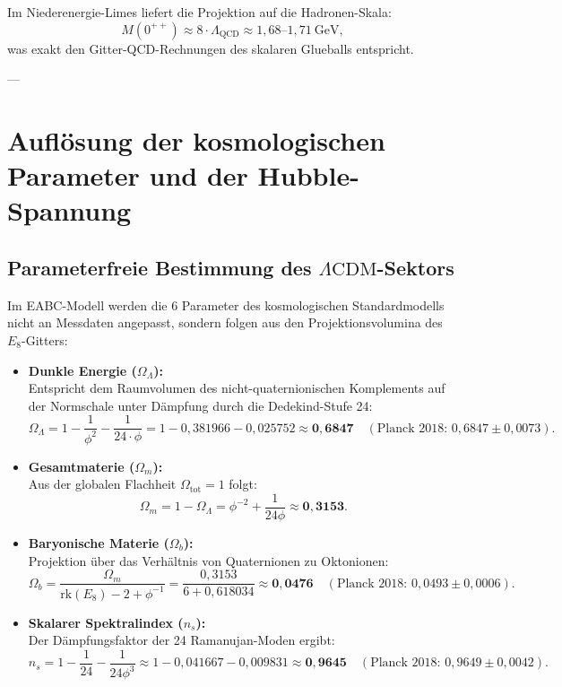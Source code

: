 \documentclass[11pt,a4paper]{article}
\theoremstyle{definition}
\theoremstyle{remark}
\numberwithin{equation}{section}
\begin{document}
Im Niederenergie-Limes liefert die Projektion auf die Hadronen-Skala:
\begin{equation}
M(0^{++}) \approx 8 \cdot \Lambda_{\mathrm{QCD}} \approx 1{,}68\text{--}1{,}71\ \text{GeV},
\end{equation}
was exakt den Gitter-QCD-Rechnungen des skalaren Glueballs entspricht.

---

\section{Auflösung der kosmologischen Parameter und der Hubble-Spannung}

\subsection{Parameterfreie Bestimmung des $\Lambda\mathrm{CDM}$-Sektors}

Im EABC-Modell werden die 6 Parameter des kosmologischen Standardmodells nicht an Messdaten angepasst, sondern folgen aus den Projektionsvolumina des $E_8$-Gitters:

\begin{itemize}
    \item \textbf{Dunkle Energie ($\Omega_\Lambda$):}\\
    Entspricht dem Raumvolumen des nicht-quaternionischen Komplements auf der Normschale unter Dämpfung durch die Dedekind-Stufe 24:
    \begin{equation}
    \Omega_\Lambda = 1 - \frac{1}{\phi^2} - \frac{1}{24 \cdot \phi} = 1 - 0{,}381966 - 0{,}025752 \approx \mathbf{0{,}6847} \quad (\text{Planck 2018: } 0{,}6847 \pm 0{,}0073).
    \end{equation}
    \item \textbf{Gesamtmaterie ($\Omega_m$):}\\
    Aus der globalen Flachheit $\Omega_{\mathrm{tot}} = 1$ folgt:
    \begin{equation}
    \Omega_m = 1 - \Omega_\Lambda = \phi^{-2} + \frac{1}{24\phi} \approx \mathbf{0{,}3153}.
    \end{equation}
    \item \textbf{Baryonische Materie ($\Omega_b$):}\\
    Projektion über das Verhältnis von Quaternionen zu Oktonionen:
    \begin{equation}
    \Omega_b = \frac{\Omega_m}{\mathrm{rk}(E_8) - 2 + \phi^{-1}} = \frac{0{,}3153}{6 + 0{,}618034} \approx \mathbf{0{,}0476} \quad (\text{Planck 2018: } 0{,}0493 \pm 0{,}0006).
    \end{equation}
    \item \textbf{Skalarer Spektralindex ($n_s$):}\\
    Der Dämpfungsfaktor der 24 Ramanujan-Moden ergibt:
    \begin{equation}
    n_s = 1 - \frac{1}{24} - \frac{1}{24\phi^3} \approx 1 - 0{,}041667 - 0{,}009831 \approx \mathbf{0{,}9645} \quad (\text{Planck 2018: } 0{,}9649 \pm 0{,}0042).
    \end{equation}
\end{itemize}
\end{document}
